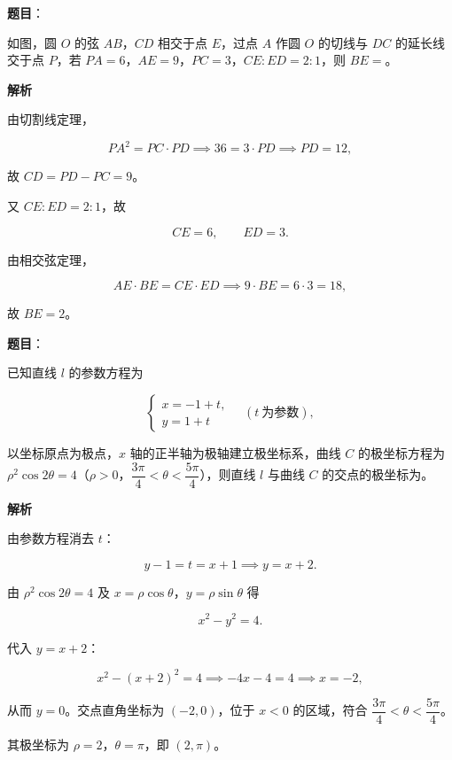 \begin{answer}

\textbf{题目}：

如图，圆 $O$ 的弦 $AB$，$CD$ 相交于点 $E$，过点 $A$ 作圆 $O$ 的切线与 $DC$ 的延长线交于点 $P$，若 $PA=6$，$AE=9$，$PC=3$，$CE:ED=2:1$，则 $BE=$\gkblank{}。
\nopagebreak[4]
\begin{center}\end{center}
\nopagebreak[4]
\textbf{解析}

由切割线定理，

\nopagebreak[4]
\[
PA^{2}=PC\cdot PD\implies 36=3\cdot PD\implies PD=12,
\]

故 $CD=PD-PC=9$。

又 $CE:ED=2:1$，故

\nopagebreak[4]
\[
CE=6,\qquad ED=3.
\]

由相交弦定理，

\nopagebreak[4]
\[
AE\cdot BE=CE\cdot ED\implies 9\cdot BE=6\cdot 3=18,
\]

故 $BE=2$。


\end{answer}
\begin{answer}

\textbf{题目}：

已知直线 $l$ 的参数方程为

\nopagebreak[4]
\[
\begin{cases}
x=-1+t,\\
y=1+t
\end{cases}
\quad (t\ \text{为参数}),
\]

以坐标原点为极点，$x$ 轴的正半轴为极轴建立极坐标系，曲线 $C$ 的极坐标方程为 $\rho^{2}\cos 2\theta=4$（$\rho>0$，$\dfrac{3\pi}{4}<\theta<\dfrac{5\pi}{4}$），则直线 $l$ 与曲线 $C$ 的交点的极坐标为\gkblank{}。

\textbf{解析}

由参数方程消去 $t$：

\nopagebreak[4]
\[
y-1=t=x+1\implies y=x+2.
\]

由 $\rho^{2}\cos 2\theta=4$ 及 $x=\rho\cos\theta$，$y=\rho\sin\theta$ 得

\nopagebreak[4]
\[
x^{2}-y^{2}=4.
\]

代入 $y=x+2$：

\nopagebreak[4]
\[
x^{2}-(x+2)^{2}=4\implies -4x-4=4\implies x=-2,
\]

从而 $y=0$。交点直角坐标为 $(-2,0)$，位于 $x<0$ 的区域，符合 $\dfrac{3\pi}{4}<\theta<\dfrac{5\pi}{4}$。

其极坐标为 $\rho=2$，$\theta=\pi$，即 $(2,\pi)$。


\end{answer}
